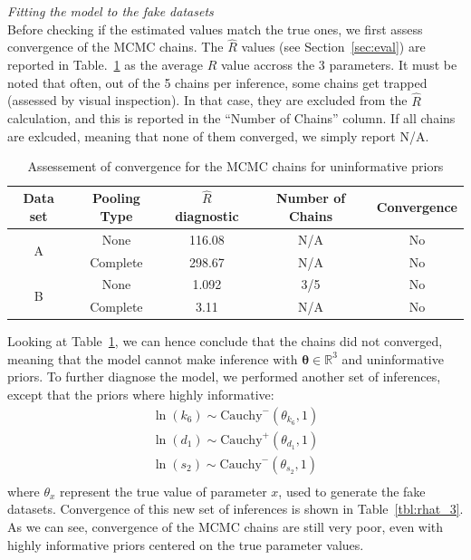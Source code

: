 \documentclass[11pt]{article}
\begin{document}
\textit{Fitting the model to the fake datasets}\\[5pt] 
Before checking if the estimated values match the true ones, we first assess convergence of the MCMC chains. The $\hat{R}$ values (see Section~\ref{sec:eval}) are reported in Table.~\ref{tbl:rhat_2} as the average $\hat{R}$ value accross the 3 parameters. It must be noted that often, out of the 5 chains per inference, some chains  get trapped (assessed by visual inspection). In that case, they are excluded from the $\hat{R}$ calculation, and this is reported in the ``Number of Chains'' column. If all chains are exlcuded, meaning that none of them converged, we simply report N/A.

\begin{table}[!h]
    \centering
    \caption{Assessement of convergence for the MCMC chains for uninformative priors}
    \begin{tabular}{c|c||c|c|c}
        \hline
        Data set & Pooling Type & $\hat{R}$ diagnostic & Number of Chains & Convergence  \\ \hline 
        \multirow{2}{*}{A}      & None     & 116.08 & N/A & No \\
                                & Complete & 298.67 & N/A & No \\ \hline 
        \multirow{2}{*}{B}      & None     & 1.092  & 3/5 & No \\
                                & Complete & 3.11   & N/A & No \\ \hline 
    \end{tabular}
    \label{tbl:rhat_2}
\end{table}
Looking at Table~\ref{tbl:rhat_2}, we can hence conclude that the chains did not converged, meaning that the model cannot make inference with $\boldsymbol{\theta} \in \mathbb{R}^3$ and uninformative priors. To further diagnose the model, we performed another set of inferences, except that the priors where highly informative:
\begin{align*}
    \ln(k_6) \sim \text{Cauchy}^-(\theta_{k_6}, 1) \\ 
    \ln(d_1) \sim \text{Cauchy}^+(\theta_{d_1}, 1) \\ 
    \ln(s_2) \sim \text{Cauchy}^-(\theta_{s_2}, 1) \\ 
\end{align*} 
where $\theta_x$ represent the true value of parameter $x$, used to generate the fake datasets. Convergence of this new set of inferences is shown in Table~\ref{tbl:rhat_3}. As we can see, convergence of the MCMC chains are still very poor, even with highly informative priors centered on the true parameter values.
\end{document}
